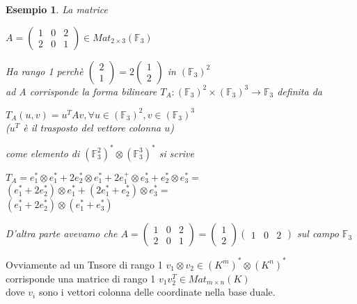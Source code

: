 \documentclass[a4paper,12pt]{article}
\theoremstyle{def}
\theoremstyle{prop}
\theoremstyle{esempio}
\newtheorem*{example}{Esempio}
\theoremstyle{dimostrazione}
\theoremstyle{teo}
\theoremstyle{osservazione}
\begin{document}
\begin{example}
	La matrice
	\begin{center}
		\(A = \begin{pmatrix}
			1 & 0 & 2  \\
			2 & 0 & 1
		\end{pmatrix} \in Mat_{2 \times 3}(\mathbb{F}_3)\)
	\end{center}
	Ha rango 1 perchè 
	\(\begin{pmatrix}
		2 \\
		1
	\end{pmatrix} = 2
	\begin{pmatrix}
		1 \\
		2
	\end{pmatrix}\) in \((\mathbb{F}_3)^2\)\\
	ad A corrisponde la forma bilineare \(T_A: (\mathbb{F}_3)^2 \times (\mathbb{F}_3)^3 \rightarrow \mathbb{F}_3\) definita da
	\begin{center}
		\(T_A(u, v) = u^T A v, \forall u \in (\mathbb{F}_3)^2, v \in (\mathbb{F}_3)^3\)\\
		(\(u^T\) è il trasposto del vettore colonna \(u\))
	\end{center}
	come elemento di \((\mathbb{F}_3^2)^* \otimes (\mathbb{F}_3^3)^*\) si scrive
	\begin{center}
		\(T_A = e_1^* \otimes e_1^* + 2 e_2^* \otimes e_1^* + 2 e_1^+ \otimes e_3^* + e_2^* \otimes e_3^* = \)\\
		\((e_1^* + 2 e_2^*) \otimes e_1^* + (2 e_1^* + e_2^*) \otimes e_3^* = \)\\
		\((e_1^* + 2 e_2^*) \otimes (e_1^* + e_3^*)\)
	\end{center}
	D'altra parte avevamo che \(A = \begin{pmatrix}
		1 & 0 & 2  \\
		2 & 0 & 1
	\end{pmatrix} = \begin{pmatrix}
		1 \\
		2
	\end{pmatrix} \begin{pmatrix}
		1 & 0 & 2
	\end{pmatrix}\) sul campo \(\mathbb{F}_3\)
\end{example}

Ovviamente ad un Tnsore di rango 1 \(v_1 \otimes v_2 \in (K^m)^* \otimes (K^n)^*\)\\
corrisponde una matrice di rango 1 \(v_1 v_2^T \in Mat_{m \times n}(K)\)\\
dove \(v_i\) sono i vettori colonna delle coordinate nella base duale.
\end{document}
